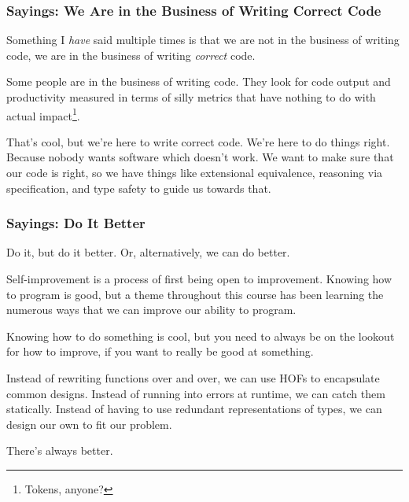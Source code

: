 \documentclass[aspectratio=169, handout]{beamer}
\begin{document}
\begin{frame}[fragile]
  \frametitle{Sayings: We Are in the Business of Writing Correct Code}

  Something I \textit{have} said multiple times is that we are not in
  the business of writing code, we are in the business of writing
  \textit{correct} code.

  \pause
  \vspace{\fill}

  Some people are in the business of writing code. They look for code
  output and productivity measured in terms of silly metrics that have
  nothing to do with actual impact\footnote{Tokens, anyone?}.

  \pause
  \vspace{\fill}

  That's cool, but we're here to write correct code. We're here to do
  things right. Because nobody wants software which doesn't work. We
  want to make sure that our code is right, so we have things like
  extensional equivalence, reasoning via specification, and type safety
  to guide us towards that.
\end{frame}

\begin{frame}[fragile]
  \frametitle{Sayings: Do It Better}

  Do it, but do it better. Or, alternatively, we can do better.

  \pause
  \vspace{\fill}

  Self-improvement is a process of first being open to improvement.
  Knowing how to program is good, but a theme throughout this course has
  been learning the numerous ways that we can improve our ability to
  program.

  \pause
  \vspace{\fill}

  Knowing how to do something is cool, but you need to always be on the
  lookout for how to improve, if you want to really be good at something.

  \pause
  \vspace{\fill}

  Instead of rewriting functions over and over, we can use HOFs to encapsulate
  common designs. Instead of running into errors at runtime, we can catch
  them statically. Instead of having to use redundant representations of types,
  we can design our own to fit our problem.

  \pause
  \vspace{\fill}

  There's always better.
\end{frame}
\end{document}
